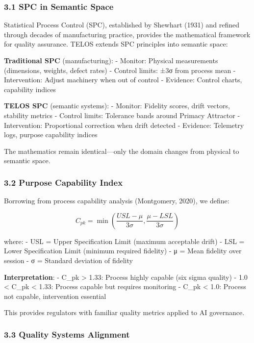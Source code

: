 \subsubsection{3.1 SPC in Semantic Space}\label{spc-in-semantic-space}

Statistical Process Control (SPC), established by Shewhart (1931) and
refined through decades of manufacturing practice, provides the
mathematical framework for quality assurance. TELOS extends SPC
principles into semantic space:

\textbf{Traditional SPC} (manufacturing): - Monitor: Physical
measurements (dimensions, weights, defect rates) - Control limits: ±3σ
from process mean - Intervention: Adjust machinery when out of control -
Evidence: Control charts, capability indices

\textbf{TELOS SPC} (semantic systems): - Monitor: Fidelity scores, drift
vectors, stability metrics - Control limits: Tolerance bands around
Primacy Attractor - Intervention: Proportional correction when drift
detected - Evidence: Telemetry logs, purpose capability indices

The mathematics remain identical---only the domain changes from physical
to semantic space.

\subsubsection{3.2 Purpose Capability
Index}\label{purpose-capability-index}

Borrowing from process capability analysis (Montgomery, 2020), we
define:

\[C_{pk} = \min\left(\frac{USL - \mu}{3\sigma}, \frac{\mu - LSL}{3\sigma}\right)\]

where: - USL = Upper Specification Limit (maximum acceptable drift) -
LSL = Lower Specification Limit (minimum required fidelity) - μ = Mean
fidelity over session - σ = Standard deviation of fidelity

\textbf{Interpretation}: - C\_pk \textgreater{} 1.33: Process highly
capable (six sigma quality) - 1.0 \textless{} C\_pk \textless{} 1.33:
Process capable but requires monitoring - C\_pk \textless{} 1.0: Process
not capable, intervention essential

This provides regulators with familiar quality metrics applied to AI
governance.

\subsubsection{3.3 Quality Systems
Alignment}\label{quality-systems-alignment}

